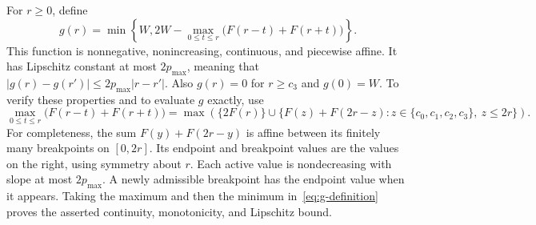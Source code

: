 \documentclass[11pt]{article}
\numberwithin{equation}{section}
\theoremstyle{definition}
\begin{document}
For $r\ge0$, define
\begin{equation}\label{eq:g-definition}
 g(r)=\min\left\{W,
  2W-\max_{0\le t\le r}\bigl(F(r-t)+F(r+t)\bigr)\right\}.
\end{equation}
This function is nonnegative, nonincreasing, continuous, and piecewise
affine. It has Lipschitz constant at most $2p_{\max}$, meaning that
$|g(r)-g(r')|\le2p_{\max}|r-r'|$. Also $g(r)=0$ for $r\ge c_3$ and
$g(0)=W$. To verify these properties and to evaluate $g$ exactly, use
\begin{equation}\label{eq:g-finite}
 \max_{0\le t\le r}\bigl(F(r-t)+F(r+t)\bigr)
 =\max\left(\{2F(r)\}\cup
 \{F(z)+F(2r-z):z\in\{c_0,c_1,c_2,c_3\},\ z\le2r\}\right).
\end{equation}
For completeness, the sum $F(y)+F(2r-y)$ is affine between its finitely
many breakpoints on $[0,2r]$. Its endpoint and breakpoint values are the
values on the right, using symmetry about $r$.
Each active value is nondecreasing with slope at most $2p_{\max}$.
A newly admissible breakpoint has the endpoint value when it appears.
Taking the maximum and then the minimum in~\eqref{eq:g-definition}
proves the asserted continuity, monotonicity, and Lipschitz bound.
\end{document}
